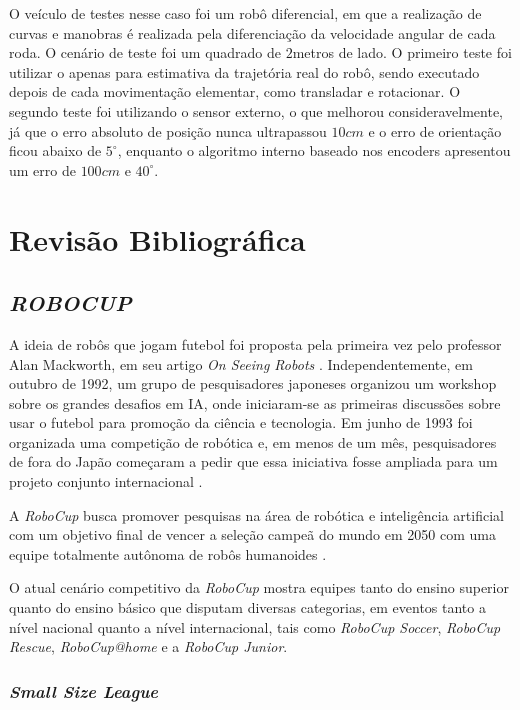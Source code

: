 \documentclass[acronym, symbols]{fei}
\begin{document}
	O veículo de testes nesse caso foi um robô diferencial, em que a realização de curvas e manobras é realizada pela diferenciação da velocidade angular de cada roda. O cenário de teste foi um quadrado de $2$\gls{metros} de lado. O primeiro teste foi utilizar o  apenas para estimativa da trajetória real do robô, sendo executado depois de cada movimentação elementar, como transladar e rotacionar. O segundo teste foi utilizando o sensor externo, o que melhorou consideravelmente, já que o erro absoluto de posição nunca ultrapassou $10cm$ e o erro de orientação ficou abaixo de $5^\circ$, enquanto o algoritmo interno baseado nos encoders apresentou um erro de $100cm$ e $40^\circ$.
	
		
\chapter{Revisão Bibliográfica}

	\section{\textit{ROBOCUP}}
	
		A ideia de robôs que jogam futebol foi proposta pela primeira vez pelo professor Alan Mackworth, em seu artigo \textit{On Seeing Robots} \cite{OnSeeingRobots}. Independentemente, em outubro de 1992, um grupo de pesquisadores japoneses organizou um workshop sobre os grandes desafios em IA, onde iniciaram-se as primeiras discussões sobre usar o futebol para promoção da ciência e tecnologia. Em junho de 1993 foi organizada uma competição de robótica e, em menos de um mês, pesquisadores de fora do Japão começaram a pedir que essa iniciativa fosse ampliada para um projeto conjunto internacional \cite{RoboCup}.
		
		A \textit{RoboCup} busca promover pesquisas na área de robótica e inteligência artificial com um objetivo final de vencer a seleção campeã do mundo em 2050 com uma equipe totalmente autônoma de robôs humanoides \cite{RoboCup}.
		
		O atual cenário competitivo da \textit{RoboCup} mostra equipes tanto do ensino superior quanto do ensino básico que disputam diversas categorias, em eventos tanto a nível nacional quanto a nível internacional, tais como \textit{RoboCup Soccer}, \textit{RoboCup Rescue}, \textit{RoboCup@home} e a \textit{RoboCup Junior}.
	
	\subsection{\textit{Small Size League}}
	
\end{document}

